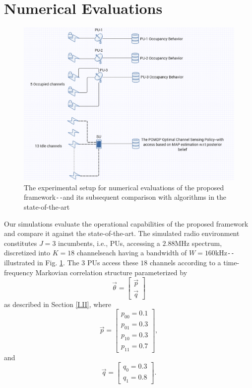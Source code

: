 \documentclass[12pt, draftcls, onecolumn]{IEEEtran}
\begin{document}
\section{Numerical Evaluations}\label{III}
\begin{figure} [htb]
    \centerline{
    \includegraphics[width = 1.0\textwidth]{POMDP_Network.PNG}}
    \caption{The experimental setup for numerical evaluations of the proposed framework\texttt{-{}-}and its subsequent comparison with algorithms in the state-of-the-art}
    \label{fig: A.add-2}
\end{figure}
Our simulations evaluate the operational capabilities of the proposed framework and compare it against the state-of-the-art. The simulated radio environment constitutes $J{=}3$ incumbents, i.e., PUs, accessing a $2.88$MHz spectrum, discretized into $K{=}18$ channels\text{-}each having a bandwidth of $W{=}160$kHz\texttt{-{}-}illustrated in Fig. \ref{fig: A.add-2}. The $3$ PUs access these $18$ channels according to a time-frequency Markovian correlation structure parameterized by
\[\vec{\theta}=\begin{bmatrix}
                    \vec{p}\\
                    \vec{q}
               \end{bmatrix}\]
as described in Section \ref{I.II}, where 
\[\vec{p}=\begin{bmatrix}
            p_{00}=0.1\\
            p_{01}=0.3\\
            p_{10}=0.3\\
            p_{11}=0.7
          \end{bmatrix},\]
and
\[\vec{q}=\begin{bmatrix}
            q_{0}=0.3\\
            q_{1}=0.8
          \end{bmatrix}.\]
\end{document}
